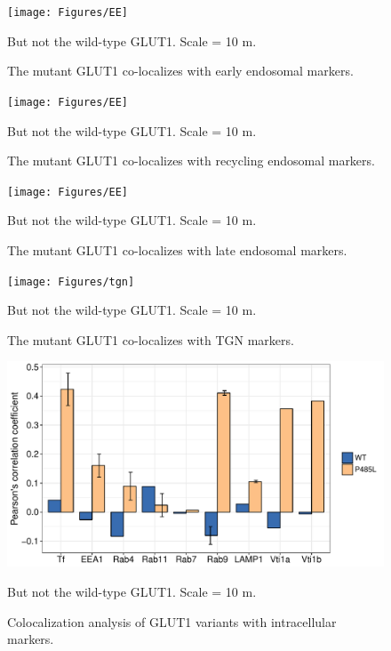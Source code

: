 \begin{figure}[h]
\centering
\texttt{[image: Figures/EE]}
\caption{The mutant GLUT1 co-localizes with early endosomal markers.}
\vspace*{-3mm}
\small \justify
But not the wild-type GLUT1. Scale = 10 \textmu m.
\label{fig:ee}
\end{figure}

\begin{figure}[h]
\centering
\texttt{[image: Figures/EE]}
\caption{The mutant GLUT1 co-localizes with recycling endosomal markers.}
\vspace*{-3mm}
\small \justify
But not the wild-type GLUT1. Scale = 10 \textmu m.
\label{fig:ee}
\end{figure}

\begin{figure}[h]
\centering
\texttt{[image: Figures/EE]}
\caption{The mutant GLUT1 co-localizes with late endosomal markers.}
\vspace*{-3mm}
\small \justify
But not the wild-type GLUT1. Scale = 10 \textmu m.
\label{fig:ee}
\end{figure}

\begin{figure}[h]
\centering
\texttt{[image: Figures/tgn]}
\caption{The mutant GLUT1 co-localizes with TGN markers.}
\vspace*{-3mm}
\small \justify
But not the wild-type GLUT1. Scale = 10 \textmu m.
\label{fig:tgn}
\end{figure}

\begin{figure}[h]
\centering
\includegraphics[scale=0.7]{Figures/coloc}
\caption{Colocalization analysis of GLUT1 variants with intracellular markers.}
\vspace*{-3mm}
\small \justify
But not the wild-type GLUT1. Scale = 10 \textmu m.
\label{fig:coloc}
\end{figure}
